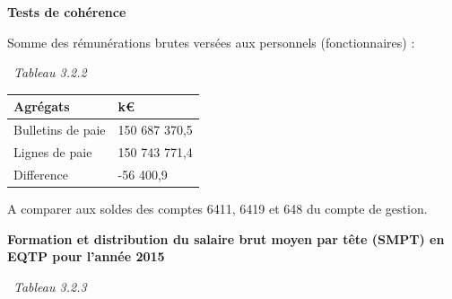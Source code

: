 \textbf{Tests de cohérence}

Somme des rémunérations brutes versées aux personnels (fonctionnaires) :

~\emph{Tableau 3.2.2}

\begin{longtable}[]{@{}ll@{}}
\toprule
Agrégats & k€\tabularnewline
\midrule
\endhead
Bulletins de paie & 150 687 370,5\tabularnewline
Lignes de paie & 150 743 771,4\tabularnewline
Difference & -56 400,9\tabularnewline
\bottomrule
\end{longtable}

A comparer aux soldes des comptes 6411, 6419 et 648 du compte de
gestion.

\textbf{Formation et distribution du salaire brut moyen par tête (SMPT)
en EQTP pour l'année 2015 }

~\emph{Tableau 3.2.3}

